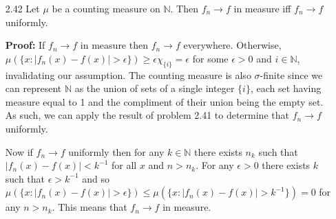 \documentclass[11pt,letter]{article}
\begin{document}
\begin{enumerate}
    \item[2.42] Let $\mu$ be a counting measure on $\mathbb{N}$. Then $f_n \rightarrow f$ in measure iff $f_n \rightarrow f$ uniformly.
    
    \textbf{Proof:} If $f_n \rightarrow f$ in measure then $f_n \rightarrow f$ everywhere. Otherwise, $\mu(\{x: |f_n(x) - f(x)| > \epsilon\}) \ge \epsilon \chi_{\{i\}} = \epsilon$ for some $\epsilon > 0$ and $i \in \mathbb{N}$, invalidating our assumption. The counting measure is also $\sigma$-finite since we can represent $\mathbb{N}$ as the union of sets of a single integer $\{i\}$, each set having measure equal to 1 and the compliment of their union being the empty set. As such, we can apply the result of problem 2.41 to determine that $f_n \rightarrow f$ uniformly.

    Now if $f_n \rightarrow f$ uniformly then for any $k \in \mathbb{N}$ there exists $n_k$ such that $|f_n(x) - f(x)| < k^{-1}$ for all $x$ and $n > n_k$. For any $\epsilon > 0$ there exists $k$ such that $\epsilon > k^{-1}$ and so \\ $\mu(\{x: |f_n(x) - f(x)| > \epsilon\}) \le \mu(\{x: |f_n(x) - f(x)| > k^{-1}\}) = 0$ for any $n > n_k$. This means that $f_n \rightarrow f$ in measure.
    
\end{enumerate}
\end{document}
